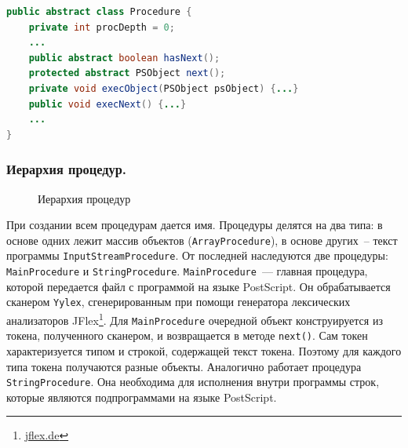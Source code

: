 \begin{lstlisting}[label=Procedure-listing,caption=Абстракный класс Procedure, frame = none, language = Java]
public abstract class Procedure {
    private int procDepth = 0;
    ...
    public abstract boolean hasNext();
    protected abstract PSObject next(); 
    private void execObject(PSObject psObject) {...}
    public void execNext() {...}
    ...
}
\end{lstlisting}

\subsubsection*{Иерархия процедур.}

\begin{figure}[t]
\caption{Иерархия процедур}\label{procedures}
\end{figure}

При создании всем процедурам дается имя. Процедуры делятся на два типа: в основе одних лежит массив объектов (\texttt{ArrayProcedure}), в основе других~-- текст программы \texttt{InputStreamProcedure}. От последней наследуются две процедуры: \texttt{MainProcedure} и \texttt{StringProcedure}. \texttt{MainProcedure}~--- главная процедура, которой передается файл с программой на языке PostScript. Он обрабатывается сканером \texttt{Yylex}, сгенерированным при помощи генератора лексических анализаторов JFlex\footnote{\url{jflex.de}}. Для \texttt{MainProcedure} очередной объект конструируется из токена, полученного сканером, и возвращается в методе \texttt{next()}. Сам токен характеризуется типом и строкой, содержащей текст токена. Поэтому для каждого типа токена получаются разные объекты. Аналогично работает процедура \texttt{StringProcedure}. Она необходима для исполнения внутри программы строк, которые являются подпрограммами на языке PostScript.

